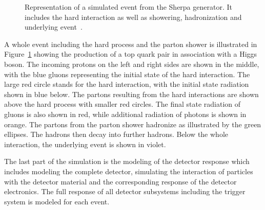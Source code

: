 \begin{figure}[htbp!]
  \begin{center}
\caption{Representation of a simulated event from the Sherpa generator. It includes the hard interaction as well as showering, hadronization and underlying event~\cite{Gleisberg:2008ta}.
  \label{fig:sim_sherpa}}
  \end{center}
\end{figure}

A whole event including the hard process and the parton shower is illustrated in Figure~\ref{fig:sim_sherpa} showing the production of a top quark pair in association with a Higgs boson.
The incoming protons on the left and right sides are shown in the middle, with the blue gluons representing the initial state of the hard interaction.
The large red circle stands for the hard interaction, with the initial state radiation shown in blue below.
The partons resulting from the hard interactions are shown above the hard process with smaller red circles. The final state radiation of gluons is also shown in red, while additional radiation of photons is shown in orange.
The partons from the parton shower hadronize as illustrated by the green ellipses. The hadrons then decay into further hadrons.
Below the whole interaction, the underlying event is shown in violet.

The last part of the simulation is the modeling of the detector response which includes modeling the complete detector, simulating the interaction of particles with the detector material and the corresponding
response of the detector electronics. The full response of all detector subsystems including the trigger system is modeled for each event.

